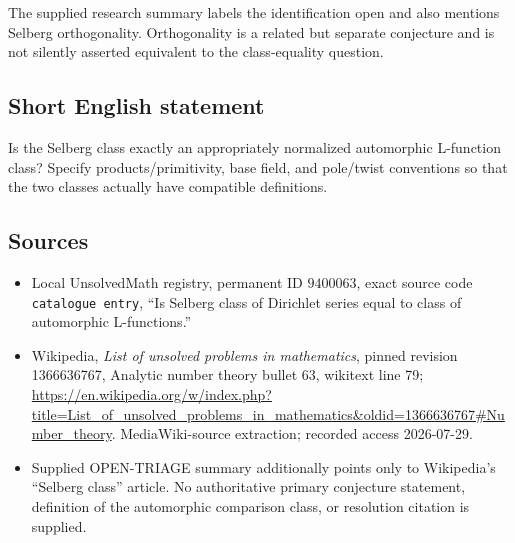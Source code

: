 \documentclass[11pt]{article}
\begin{document}
The supplied research summary labels the identification open and also mentions Selberg orthogonality. Orthogonality is a related but separate conjecture and is not silently asserted equivalent to the class-equality question.
\subsection{Short English statement}
Is the Selberg class exactly an appropriately normalized automorphic L-function class? Specify products/primitivity, base field, and pole/twist conventions so that the two classes actually have compatible definitions.
\subsection{Sources}
\begin{itemize}
\item Local UnsolvedMath registry, permanent ID \(9400063\), exact source code \texttt{catalogue entry}, ``Is Selberg class of Dirichlet series equal to class of automorphic L-functions.''
\item Wikipedia, \emph{List of unsolved problems in mathematics}, pinned revision 1366636767, Analytic number theory bullet 63, wikitext line 79; \url{https://en.wikipedia.org/w/index.php?title=List_of_unsolved_problems_in_mathematics&oldid=1366636767#Number_theory}. MediaWiki-source extraction; recorded access 2026-07-29.
\item Supplied OPEN-TRIAGE summary additionally points only to Wikipedia's ``Selberg class'' article. No authoritative primary conjecture statement, definition of the automorphic comparison class, or resolution citation is supplied.
\end{itemize}
\end{document}

